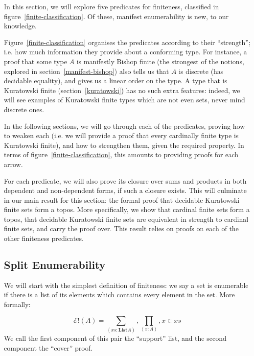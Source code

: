 \begin{refsection}
In this section, we will explore five predicates for finiteness, classified in
figure~\ref{finite-classification}.
Of these, manifest enumerability is new, to our knowledge.

Figure~\ref{finite-classification} organises the predicates according to
their ``strength''; i.e. how much information they provide about a conforming
type.
For instance, a proof that some type \(A\) is manifestly Bishop finite (the
strongest of the notions, explored in section~\ref{manifest-bishop}) also tells
us that \(A\) is discrete (has decidable equality), and gives us a linear order
on the type.
A type that is Kuratowski finite (section~\ref{kuratowski}) has no such extra
features: indeed, we will see examples of Kuratowski finite types which are not
even sets, never mind discrete ones.

In the following sections, we will go through each of the predicates, proving
how to weaken each (i.e. we will provide a proof that every cardinally finite
type is Kuratowski finite), and how to strengthen them, given the required
property.
In terms of figure~\ref{finite-classification}, this amounts to providing proofs
for each arrow.

For each predicate, we will also prove its closure over sums and products in
both dependent and non-dependent forms, if such a closure exists.
This will culminate in our main result for this section: the formal proof that
decidable Kuratowski finite sets form a topos. 
More specifically, we show that cardinal finite sets form a topos, that
decidable Kuratowski finite sets are equivalent in strength to cardinal finite
sets, and carry the proof over.
This result relies on proofs on each of the other finiteness predicates.
\subsection{Split Enumerability} \label{split-enumerable}
We will start with the simplest definition of finiteness: we say a set is
enumerable if there is a list of its elements which contains every element in
the set.
More formally:
\begin{definition}
  \begin{equation}
    \mathcal{E}!(A) = \sum_{(\mathit{xs} : \textbf{List} A)} , \prod_{(x : A)} , x \in xs
  \end{equation}
  We call the first component of this pair the ``support'' list, and the second
  component the ``cover'' proof.
\end{definition}


\end{refsection}
